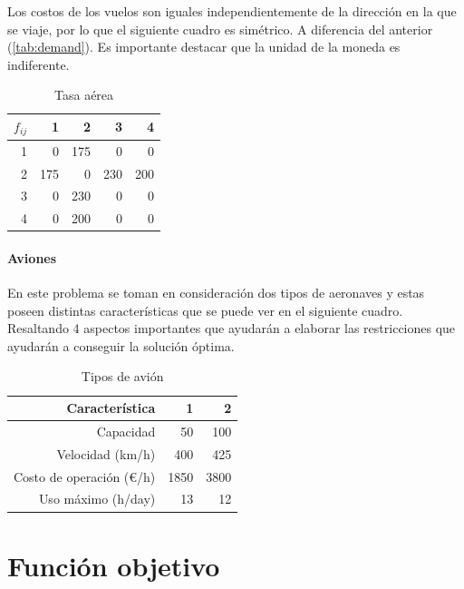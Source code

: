 \documentclass[12pt]{article}
\begin{document}
Los costos de los vuelos son iguales independientemente de la dirección en la que se viaje, por lo que el siguiente cuadro es simétrico. A diferencia del anterior (\ref{tab:demand}). Es importante destacar que la unidad de la moneda es indiferente.

\begin{table}[h!]
    \centering
    \begin{tabular}{r|r|r|r|r}
        $f_{ij}$%
               &   1  &   2  &   3  &   4\\
            \hline
            \hline
            1  &   0  & 175  &   0  &   0\\
            2  & 175  &   0  & 230  & 200\\
            3  &   0  & 230  &   0  &   0\\
            4  &   0  & 200  &   0  &   0\\
    \end{tabular}
    \caption{Tasa aérea}
    \label{tab:fare}
\end{table}

\paragraph{Aviones}

En este problema se toman en consideración dos tipos de aeronaves y estas poseen distintas características que se puede ver en el siguiente cuadro. Resaltando 4 aspectos importantes que ayudarán a elaborar las restricciones que ayudarán a conseguir la solución óptima.

\begin{table}[h!]
    \centering
    \begin{tabular}{r|r|r}
        Característica               &    1 &    2\\
        \hline
        \hline
        Capacidad                    &   50 &  100\\
        Velocidad (km/h)             &  400 &  425\\
        Costo de operación (\euro/h) & 1850 & 3800\\
        Uso máximo (h/day)           &   13 &   12\\
    \end{tabular}
    \caption{Tipos de avión}
    \label{tab:planes}
\end{table}

\section{Función objetivo}
\end{document}
